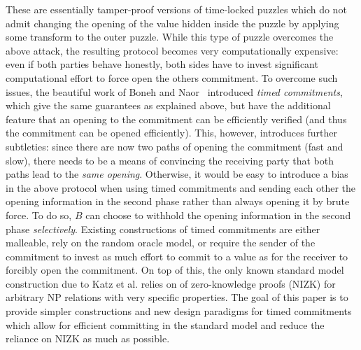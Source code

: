 These are essentially tamper-proof versions of time-locked puzzles which do not admit changing the opening of the value hidden inside the puzzle by applying some transform to the outer puzzle. While this type of puzzle overcomes the above attack, the resulting protocol becomes very computationally expensive: even if both parties behave honestly, both sides have to invest significant computational effort to force open the others commitment. To overcome such issues, the beautiful work of Boneh and Naor~\cite{C:BonNao00} introduced \emph{timed commitments}, which give the same guarantees as explained above, but have the additional feature that an opening to the commitment can be efficiently verified (and thus the commitment can be opened efficiently). This, however, introduces further subtleties: since there are now two paths of opening the commitment (fast and slow), there needs to be a means of convincing the receiving party that both paths lead to the \emph{same opening}. Otherwise, it would be easy to introduce a bias in the above protocol when using timed commitments and sending each other the opening information in the second phase rather than always opening it by brute force. To do so, $B$ can choose to withhold the opening information in the second phase \emph{selectively}.
Existing constructions of timed commitments are either malleable, rely on the random oracle model, or require the sender of the commitment to invest as much effort to commit to a value as for the receiver to forcibly open the commitment. On top of this, the only known standard model construction due to Katz et al. \cite{TCC:KatLosXu20} relies on of zero-knowledge proofs (NIZK) for arbitrary NP relations with very specific properties. The goal of this paper is to provide simpler constructions and new design paradigms for timed commitments which allow for efficient committing in the standard model and reduce the reliance on NIZK as much as possible. 
